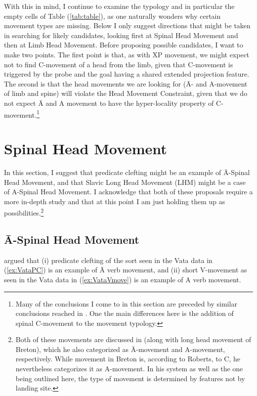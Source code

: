 \documentclass[output=paper,colorlinks,citecolor=brown,
]{langscibook}
\begin{document}
With this in mind, I continue to examine the typology and in particular the empty cells of Table (\ref{tab:table}), as one naturally wonders why certain movement types are missing.  Below I only suggest directions that might be taken in searching for likely candidates, looking first at Spinal Head Movement and then at Limb Head Movement.  Before proposing possible candidates, I want to make two points.  The first point is that, as with XP movement, we might  expect not to find C-movement of a head from the limb, given that C-movement is triggered by the probe and the goal having a shared extended projection feature. The second is that the head movements we are looking for (\=A- and A-movement of limb and spine) will violate the Head Movement Constraint, given that we do not expect  \=A and A movement to have the hyper-locality property of C-movement.\footnote{Many of the conclusions I come to in this section are preceded by similar conclusions reached in \citet{Roberts:2010}.  One the main differences here is the  addition of spinal C-movement to the movement typology.}
 
\section{Spinal Head Movement}

In this section, I suggest that predicate clefting might be an example of \=A-Spinal Head Movement, and that Slavic Long Head Movement (LHM) might be a case of A-Spinal Head Movement.  I acknowledge that both of these proposals require a more in-depth study and that at this point I am just holding them up as possibilities.\footnote{Both of these movements are discussed in \citet{Roberts:2010} (along with long head movement of Breton), which he also categorized as \=A-movement and A-movement, respectively.  While movement in Breton is, according to Roberts, to C, he nevertheless categorizes it as A-movement.  In his system as well as the one being outlined here, the type of movement is determined by features not by landing site.}


\subsection{\=A-Spinal Head Movement}

\citet{Koopman:1984} argued that (i) predicate clefting of the sort seen in the Vata data in (\ref{ex:VataPC})   is an example of \=A verb movement, and (ii) short V-movement as seen in the Vata data in   (\ref{ex:VataVmove}) is an example of A verb movement.  
\end{document}
